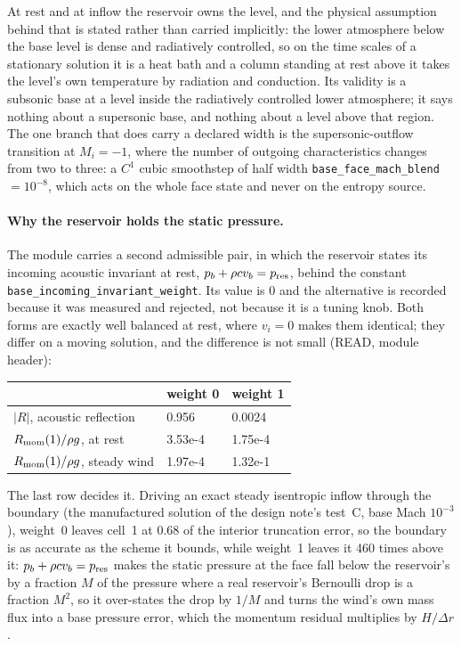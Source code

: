 \documentclass[english,a4paper]{my_memo}
\begin{document}
At rest and at inflow the reservoir owns the level, and the physical
assumption behind that is stated rather than carried implicitly: the lower
atmosphere below the base level is dense and radiatively controlled, so on
the time scales of a stationary solution it is a heat bath and a column
standing at rest above it takes the level's own temperature by radiation and
conduction. Its validity is a subsonic base at a level inside the radiatively
controlled lower atmosphere; it says nothing about a supersonic base, and
nothing about a level above that region. The one branch that does carry a
declared width is the supersonic-outflow transition at $M_i=-1$, where the
number of outgoing characteristics changes from two to three: a $C^1$ cubic
smoothstep of half width \texttt{base\_face\_mach\_blend} $=10^{-8}$, which
acts on the whole face state and never on the entropy source.

\paragraph{Why the reservoir holds the static pressure.}
The module carries a second admissible pair, in which the reservoir states
its incoming acoustic invariant at rest, $p_b + \rho c v_b = p_{\rm res}$,
behind the constant \texttt{base\_incoming\_invariant\_weight}. Its value is
$0$ and the alternative is recorded because it was measured and rejected,
not because it is a tuning knob. Both forms are exactly well balanced at
rest, where $v_i = 0$ makes them identical; they differ on a moving
solution, and the difference is not small (READ, module header):

\begin{center}\small
\begin{tabular}{@{}lll@{}}
\toprule
 & weight 0 & weight 1 \\
\midrule
$|R|$, acoustic reflection      & 0.956    & 0.0024 \\
$R_{\rm mom}(1)/\rho g$, at rest        & 3.53e-4  & 1.75e-4 \\
$R_{\rm mom}(1)/\rho g$, steady wind    & 1.97e-4  & 1.32e-1 \\
\bottomrule
\end{tabular}
\end{center}

The last row decides it. Driving an exact steady isentropic inflow through
the boundary (the manufactured solution of the design note's test~C, base
Mach $10^{-3}$), weight~0 leaves cell~1 at $0.68$ of the interior truncation
error, so the boundary is as accurate as the scheme it bounds, while
weight~1 leaves it 460 times above it: $p_b + \rho c v_b = p_{\rm res}$
makes the static pressure at the face fall below the reservoir's by a
fraction $M$ of the pressure where a real reservoir's Bernoulli drop is a
fraction $M^2$, so it over-states the drop by $1/M$ and turns the wind's own
mass flux into a base pressure error, which the momentum residual multiplies
by $H/\Delta r$.
\end{document}
